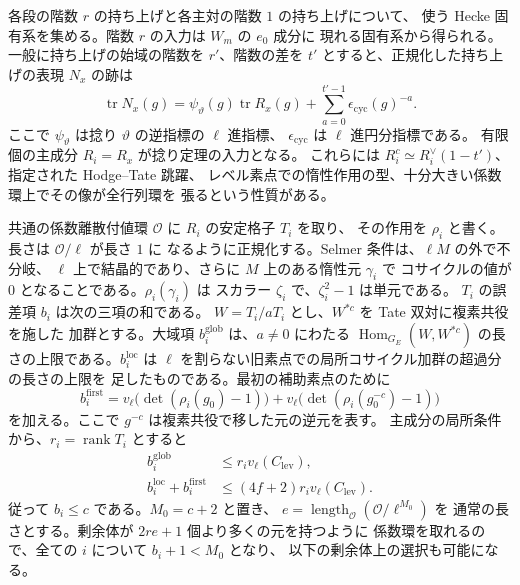 各段の階数 \(r\) の持ち上げと各主対の階数 \(1\) の持ち上げについて、
使う Hecke 固有系を集める。階数 \(r\) の入力は \(W_m\) の \(e_0\) 成分に
現れる固有系から得られる。一般に持ち上げの始域の階数を \(r'\)、階数の差を
\(t'\) とすると、正規化した持ち上げの表現 \(N_x\) の跡は
\[
 \operatorname{tr}N_x(g)
 =\psi_\vartheta(g)\operatorname{tr}R_x(g)
   +\sum_{a=0}^{t'-1}\epsilon_{\mathrm{cyc}}(g)^{-a}.
\]
ここで \(\psi_\vartheta\) は捻り \(\vartheta\) の逆指標の \(\ell\) 進指標、
\(\epsilon_{\mathrm{cyc}}\) は \(\ell\) 進円分指標である。
有限個の主成分 \(R_i=R_x\) が捻り定理の入力となる。
これらには \(R_i^c\simeq R_i^\vee(1-t')\)、指定された Hodge--Tate 跳躍、
レベル素点での惰性作用の型、十分大きい係数環上でその像が全行列環を
張るという性質がある。



共通の係数離散付値環 \(\mathcal O\) に \(R_i\) の安定格子 \(T_i\) を取り、
その作用を \(\rho_i\) と書く。長さは \(\mathcal O/\ell\) が長さ \(1\) に
なるように正規化する。Selmer 条件は、\(\ell M\) の外で不分岐、
\(\ell\) 上で結晶的であり、さらに \(M\) 上のある惰性元 \(\gamma_i\) で
コサイクルの値が \(0\) となることである。\(\rho_i(\gamma_i)\) は
スカラー \(\zeta_i\) で、\(\zeta_i^2-1\) は単元である。
\(T_i\) の誤差項 \(b_i\) は次の三項の和である。
\(W=T_i/aT_i\) とし、\(W^{*c}\) を Tate 双対に複素共役を施した
加群とする。大域項 \(b_i^{\mathrm{glob}}\) は、\(a\ne0\) にわたる
\(\operatorname{Hom}_{G_E}(W,W^{*c})\) の長さの上限である。\(b_i^{\mathrm{loc}}\) は
\(\ell\) を割らない旧素点での局所コサイクル加群の超過分の長さの上限を
足したものである。最初の補助素点のために
\[
 b_i^{\mathrm{first}}
   =v_\ell\big(\det(\rho_i(g_0)-1)\big)
    +v_\ell\big(\det(\rho_i(g_0^{-c})-1)\big)
\]
を加える。ここで \(g^{-c}\) は複素共役で移した元の逆元を表す。
主成分の局所条件から、\(r_i=\operatorname{rank}T_i\) とすると
\[
 \begin{split}
 b_i^{\mathrm{glob}}&\le r_i v_\ell(C_{\mathrm{lev}}),\\
 b_i^{\mathrm{loc}}+b_i^{\mathrm{first}}
                   &\le (4f+2)r_i v_\ell(C_{\mathrm{lev}}).
 \end{split}
\]
従って \(b_i\le c\) である。\(M_0=c+2\) と置き、
\(e=\operatorname{length}_{\mathcal O}(\mathcal O/\ell^{M_0})\) を
通常の長さとする。剰余体が \(2re+1\) 個より多くの元を持つように
係数環を取れるので、全ての \(i\) について \(b_i+1<M_0\) となり、
以下の剰余体上の選択も可能になる。

